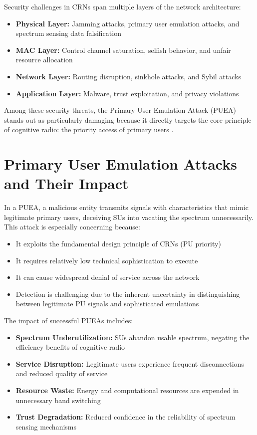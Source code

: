 Security challenges in CRNs span multiple layers of the network architecture:

\begin{itemize}[leftmargin=*,labelsep=1em,itemsep=0.5em]
    \item \textbf{Physical Layer:} Jamming attacks, primary user emulation attacks, and spectrum sensing data falsification
    \item \textbf{MAC Layer:} Control channel saturation, selfish behavior, and unfair resource allocation
    \item \textbf{Network Layer:} Routing disruption, sinkhole attacks, and Sybil attacks
    \item \textbf{Application Layer:} Malware, trust exploitation, and privacy violations
\end{itemize}

Among these security threats, the Primary User Emulation Attack (PUEA) stands out as particularly damaging because it directly targets the core principle of cognitive radio: the priority access of primary users \cite{chen2008defense}.

\section{Primary User Emulation Attacks and Their Impact}

In a PUEA, a malicious entity transmits signals with characteristics that mimic legitimate primary users, deceiving SUs into vacating the spectrum unnecessarily. This attack is especially concerning because:

\begin{itemize}
    \item It exploits the fundamental design principle of CRNs (PU priority)
    \item It requires relatively low technical sophistication to execute
    \item It can cause widespread denial of service across the network
    \item Detection is challenging due to the inherent uncertainty in distinguishing between legitimate PU signals and sophisticated emulations
\end{itemize}

The impact of successful PUEAs includes:

\begin{itemize}
    \item \textbf{Spectrum Underutilization:} SUs abandon usable spectrum, negating the efficiency benefits of cognitive radio
    \item \textbf{Service Disruption:} Legitimate users experience frequent disconnections and reduced quality of service
    \item \textbf{Resource Waste:} Energy and computational resources are expended in unnecessary band switching
    \item \textbf{Trust Degradation:} Reduced confidence in the reliability of spectrum sensing mechanisms
\end{itemize}

